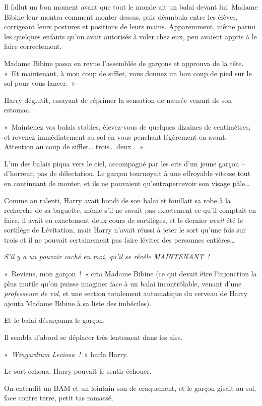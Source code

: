Il fallut un bon moment avant que tout le monde ait un balai devant lui.
Madame Bibine leur montra comment monter dessus, puis déambula entre les élèves, corrigeant leurs postures et positions de leurs mains.
Apparemment, même parmi les quelques enfants qu'on avait autorisés à voler chez eux, peu avaient appris à le faire correctement.

Madame Bibine passa en revue l'assemblée de garçons et approuva de la tête.
«~Et maintenant, à mon coup de sifflet, vous donnez un bon coup de pied sur le sol pour vous lancer.~»

Harry déglutit, essayant de réprimer la sensation de nausée venant de son estomac.

«~Maintenez vos balais stables, élevez-vous de quelques dizaines de centimètres, et revenez immédiatement au sol en vous penchant légèrement en avant.
Attention au coup de sifflet… trois… deux…~»

L'un des balais piqua vers le ciel, accompagné par les cris d'un jeune garçon -- d'horreur, pas de délectation.
Le garçon tournoyait à une effroyable vitesse tout en continuant de monter, et ils ne pouvaient qu'entrapercevoir son visage pâle…

Comme au ralenti, Harry avait bondi de son balai et fouillait sa robe à la recherche de sa baguette, même s'il ne savait pas exactement ce qu'il comptait en faire, il avait eu exactement deux cours de sortilèges, et le dernier \emph{avait} été le sortilège de Lévitation, mais Harry n'avait réussi à jeter le sort qu'une fois sur trois et il ne pouvait certainement pas faire léviter des personnes entières…

\emph{S'il y a un pouvoir caché en moi, qu'il se révèle MAINTENANT~!}

«~Reviens, mon garçon~!~»
cria Madame Bibine (ce qui devait être l'injonction la plus inutile qu'on puisse imaginer face à un balai incontrôlable, venant d'une \emph{professeure de vol}, et une section totalement automatique du cerveau de Harry ajouta Madame Bibine à sa liste des imbéciles).

Et le balai désarçonna le garçon.

Il sembla d'abord se déplacer très lentement dans les airs.

«~\emph{Wingardium Leviosa~!}~» hurla Harry.

Le sort échoua.
Harry pouvait le sentir échouer.

On entendit un BAM et un lointain son de craquement, et le garçon gisait au sol, face contre terre, petit tas ramassé.

